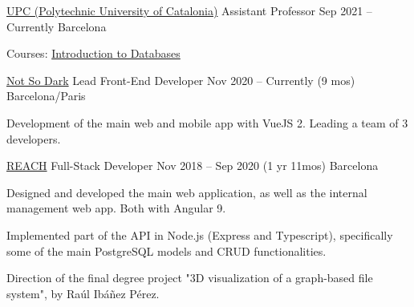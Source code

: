 

\begin{cventries}

  \cventry
    {\href{https://www.upc.edu/en}{UPC (Polytechnic University of Catalonia)}} %
    {Assistant Professor} %
    {Sep 2021 – Currently} %
    {Barcelona} %
    {
      \begin{cvitems} %
        \item {Courses: \href{https://www.fib.upc.edu/en/studies/bachelors-degrees/bachelor-degree-informatics-engineering/curriculum/syllabus/BD}{Introduction to Databases}}
      \end{cvitems}
    }

  \cventry
    {\href{https://getquokka.app/}{Not So Dark}} %
    {Lead Front-End Developer} %
    {Nov 2020 – Currently (9 mos)} %
    {Barcelona/Paris} %
    {
      \begin{cvitems} %
        \item {Development of the main web and mobile app with VueJS 2. Leading a team of 3 developers.}
      \end{cvitems}
    }

  \cventry
    {\href{https://www.myreach.io}{REACH}} %
    {Full-Stack Developer} %
    {Nov 2018 – Sep 2020 (1 yr 11mos)} %
    {Barcelona} %
    {
      \begin{cvitems} %
        \item {Designed and developed the main web application, as well as the internal management web app. Both with Angular 9.}
        \item {Implemented part of the API in Node.js (Express and Typescript), specifically some of the main PostgreSQL models and CRUD functionalities.}
        \item {Direction of the final degree project "3D visualization of a graph-based file system", by Raúl Ibáñez Pérez.}
      \end{cvitems}
    }


\end{cventries}
